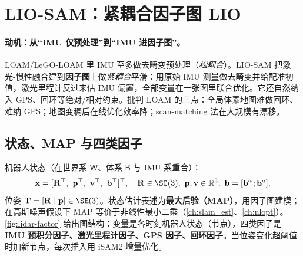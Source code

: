 \section{LIO-SAM：紧耦合因子图 LIO}
\label{sec:lidar-liosam}

\paragraph{动机：从“IMU 仅预处理”到“IMU 进因子图”。}
LOAM/LeGO-LOAM 里 IMU 至多做去畸变预处理（\emph{松耦合}）。LIO-SAM\cite{shan2020liosam} 把激光-惯性融合建到\textbf{因子图}上做\emph{紧耦合}平滑：用原始 IMU 测量做去畸变并给配准初值，激光里程计反过来估 IMU 偏置，全部变量在一张图里联合优化。它还自然纳入 GPS、回环等绝对/相对约束。批判 LOAM 的三点：全局体素地图难做回环、难纳 GPS；地图变稠后在线优化效率降；scan-matching 法在大规模有漂移。

\subsection{状态、MAP 与四类因子}
\label{sec:lidar-liosam-factors}

机器人状态（在世界系 $\mathsf{W}$、体系 $\mathsf{B}$ 与 IMU 系重合）\cite{shan2020liosam}：
\begin{equation}
  \mathbf{x}=[\mathbf{R}^\top,\ \mathbf{p}^\top,\ \mathbf{v}^\top,\ \mathbf{b}^\top]^\top,\quad \mathbf{R}\in\SO(3),\ \mathbf{p},\mathbf{v}\in\mathbb{R}^3,\ \mathbf{b}=[\mathbf{b}^\omega;\mathbf{b}^a],
  \label{eq:lidar-liosam-state}
\end{equation}
位姿 $\mathbf{T}=[\mathbf{R}\mid\mathbf{p}]\in\SE(3)$。状态估计表述为\textbf{最大后验（MAP）}，用因子图建模；在高斯噪声假设下 MAP 等价于非线性最小二乘（\cref{ch:slam_est}、\cref{ch:nlopt}）。\cref{fig:lidar-factor} 给出图结构：变量是各时刻机器人状态（节点），四类因子是\textbf{IMU 预积分因子、激光里程计因子、GPS 因子、回环因子}。当位姿变化超阈值时加新节点，每次插入用 iSAM2\cite{kaess2012isam2} 增量优化。


